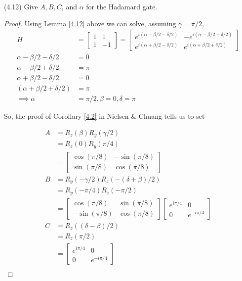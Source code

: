 \documentclass[main.tex]{subfiles}
\begin{document}
\begin{subappendices}
\begin{exercise} (4.12) Give $A, B, C$, and $\alpha$ for the Hadamard gate.

\begin{proof}
	Using Lemma \ref{4.12} above we can solve, assuming $\gamma = \pi / 2$, 
	\begin{align*}
		H &= \begin{bmatrix}
 1 & 1 \\ 1 & -1	
 \end{bmatrix} = \begin{bmatrix}
 	e^{i(\alpha - \beta / 2 - \delta / 2)} & -e^{i (\alpha - \beta /2 + \delta / 2)} \\ 
 	e^{i(\alpha + \beta / 2 - \delta / 2)} & e^{i (\alpha + \beta /2 + \delta / 2)}
 \end{bmatrix} \\ 
 \alpha - \beta / 2 - \delta / 2 &= 0 \\
 \alpha - \beta /2 + \delta / 2 &= \pi \\
 \alpha + \beta / 2 - \delta / 2 &= 0 \\
 (\alpha + \beta /2 + \delta / 2) &= \pi \\
 \implies \alpha &= \pi / 2, \beta = 0, \delta = \pi
	\end{align*}

So, the proof of Corollary \ref{4.2} in Nielsen \& Chuang tells us to set 

\begin{align*}
A &= R_z (\beta)R_y(\gamma / 2) \\
&= R_z (0)R_y(\pi / 4) \\
&= \begin{bmatrix}
 	\cos(\pi / 8) & -\sin(\pi / 8) \\
 	\sin(\pi / 8) & \cos(\pi / 8)
 \end{bmatrix}\\
B &= R_y(-\gamma/2)R_z(- (\delta+\beta)/2)\\
&= R_y(- \pi/4)R_z(- \pi/2)\\
&=  \begin{bmatrix}
 	\cos(\pi / 8) & \sin(\pi / 8) \\
 	-\sin(\pi / 8) & \cos(\pi / 8)
 \end{bmatrix} \begin{bmatrix}
 	e^{i\pi / 4} & 0 \\
 	0 & e^{- i\pi / 4}
 \end{bmatrix}\\
C &= R_z((\delta - \beta)/2)\\
&= R_z(\pi /2) \\
&= \begin{bmatrix}
 	e^{i\pi / 4} & 0 \\
 	0 & e^{- i\pi / 4}
 \end{bmatrix}\\
\end{align*}


\end{proof}
\end{exercise}
\end{subappendices}
\end{document}
